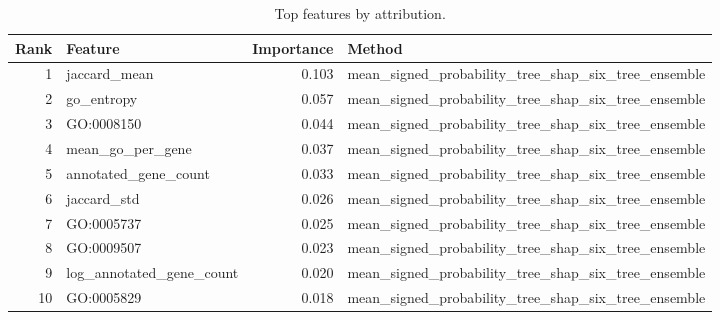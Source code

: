 \begin{table}[htbp]
\centering
\caption{Top features by attribution.}
\label{tab:top_features_recomputed}
\begin{tabular}{rlrl}
\toprule
Rank & Feature & Importance & Method \\
\midrule
1 & jaccard\_mean & 0.103 & mean\_signed\_probability\_tree\_shap\_six\_tree\_ensemble \\
2 & go\_entropy & 0.057 & mean\_signed\_probability\_tree\_shap\_six\_tree\_ensemble \\
3 & GO:0008150 & 0.044 & mean\_signed\_probability\_tree\_shap\_six\_tree\_ensemble \\
4 & mean\_go\_per\_gene & 0.037 & mean\_signed\_probability\_tree\_shap\_six\_tree\_ensemble \\
5 & annotated\_gene\_count & 0.033 & mean\_signed\_probability\_tree\_shap\_six\_tree\_ensemble \\
6 & jaccard\_std & 0.026 & mean\_signed\_probability\_tree\_shap\_six\_tree\_ensemble \\
7 & GO:0005737 & 0.025 & mean\_signed\_probability\_tree\_shap\_six\_tree\_ensemble \\
8 & GO:0009507 & 0.023 & mean\_signed\_probability\_tree\_shap\_six\_tree\_ensemble \\
9 & log\_annotated\_gene\_count & 0.020 & mean\_signed\_probability\_tree\_shap\_six\_tree\_ensemble \\
10 & GO:0005829 & 0.018 & mean\_signed\_probability\_tree\_shap\_six\_tree\_ensemble \\
\bottomrule
\end{tabular}

\end{table}
